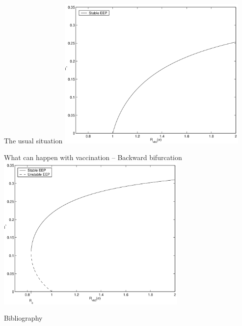 \documentclass[aspectratio=169]{beamer}\usepackage[]{graphicx}\usepackage[]{xcolor}
\begin{document}
\begin{frame}{The usual situation}
\centering
\includegraphics[width=0.7\textwidth]{FIGS/SIRV_bif_forward}
\end{frame}

\begin{frame}{What can happen with vaccination -- Backward bifurcation}
\centering
\includegraphics[width=0.7\textwidth]{FIGS/SIRV_bif_backward}
\end{frame}


\begin{frame}[allowframebreaks]{Bibliography}


\end{frame}
\end{document}

